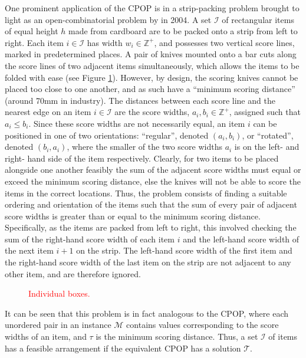 \documentclass[oribibl]{llncs}
\begin{document}
One prominent application of the CPOP is in a strip-packing problem brought to light as an open-combinatorial problem by \citeauthor{goulimis2004} in 2004. A set $\mathcal{I}$ of rectangular items of equal height $h$ made from cardboard are to be packed onto a strip from left to right. Each item $i \in \mathcal{I}$ has width $w_i \in \mathbb{Z}^{+}$, and possesses two vertical score lines, marked in predetermined places. A pair of knives mounted onto a bar cuts along the score lines of two adjacent items simultaneously, which allows the items to be folded with ease (see Figure \ref{fig:boxknife}). However, by design, the scoring knives cannot be placed too close to one another, and as such have a ``minimum scoring distance'' (around 70mm in industry). The distances between each score line and the nearest edge on an item $i \in \mathcal{I}$ are the score widths, $a_i, b_i \in \mathbb{Z}^{+}$, assigned such that $a_i \leq b_i$. Since these score widths are not necessarily equal, an item $i$ can be positioned in one of two orientations: ``regular'', denoted $(a_i, b_i)$, or ``rotated'', denoted $(b_i, a_i)$, where the smaller of the two score widths $a_i$ is on the left- and right- hand side of the item respectively. Clearly, for two items to be placed alongside one another feasibly the sum of the adjacent score widths must equal or exceed the minimum scoring distance, else the knives will not be able to score the items in the correct locations. Thus, the problem consists of finding a suitable ordering and orientation of the items such that the sum of every pair of adjacent score widths is greater than or equal to the minimum scoring distance. Specifically, as the items are packed from left to right, this involved checking the sum of the right-hand score width of each item $i$ and the left-hand score width of the next item $i+1$ on the strip. The left-hand score width of the first item and the right-hand score width of the last item on the strip are not adjacent to any other item, and are therefore ignored. 


\begin{figure}[h!]	
	\centering
	
	\caption{\textcolor{red}{Individual boxes.}}	
	\label{fig:boxknife}
\end{figure}

It can be seen that this problem is in fact analogous to the CPOP, where each unordered pair in an instance $\mathcal{M}$ contains values corresponding to the score widths of an item, and $\tau$ is the minimum scoring distance. Thus, a set $\mathcal{I}$ of items has a feasible arrangement if the equivalent CPOP has a solution $\mathcal{T}$.
\end{document}
